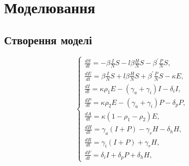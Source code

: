 
\chapter{Моделювання}

\section{Створення моделі}


\begin{equation}
    \left\{\begin{array}{l}
    \frac{d S}{d t}=-\beta \frac{I}{N} S-l \beta \frac{H}{N} S-\beta^{\prime} \frac{P}{N} S, \\
    \frac{d E}{d t}=\beta \frac{I}{N} S+l \beta \frac{H}{N} S+\beta^{\prime} \frac{P}{N} S-\kappa E, \\
    \frac{d I}{d t}=\kappa \rho_1 E-\left(\gamma_a+\gamma_i\right) I-\delta_i I, \\
    \frac{d P}{d t}=\kappa \rho_2 E-\left(\gamma_a+\gamma_i\right) P-\delta_p P, \\
    \frac{d A}{d t}=\kappa\left(1-\rho_1-\rho_2\right) E, \\
    \frac{d H}{d t}=\gamma_a(I+P)-\gamma_r H-\delta_h H, \\
    \frac{d R}{d t}=\gamma_i(I+P)+\gamma_r H, \\
    \frac{d F}{d t}=\delta_i I+\delta_p P+\delta_h H,
    \end{array}\right.
\end{equation}
\label{Model 1}